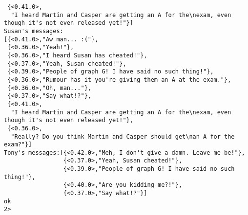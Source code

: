 \begin{verbatim}
 {<0.41.0>,
  "I heard Martin and Casper are getting an A for the\nexam, even though it's not even released yet!"}]
Susan's messages:
[{<0.41.0>,"Aw man... :("},
 {<0.36.0>,"Yeah!"},
 {<0.36.0>,"I heard Susan has cheated!"},
 {<0.37.0>,"Yeah, Susan cheated!"},
 {<0.39.0>,"People of graph G! I have said no such thing!"},
 {<0.36.0>,"Rumour has it you're giving them an A at the exam."},
 {<0.36.0>,"Oh, man..."},
 {<0.37.0>,"Say what!?"},
 {<0.41.0>,
  "I heard Martin and Casper are getting an A for the\nexam, even though it's not even released yet!"},
 {<0.36.0>,
  "Really? Do you think Martin and Casper should get\nan A for the exam?"}]
Tony's messages:[{<0.42.0>,"Meh, I don't give a damn. Leave me be!"},
                 {<0.37.0>,"Yeah, Susan cheated!"},
                 {<0.39.0>,"People of graph G! I have said no such thing!"},
                 {<0.40.0>,"Are you kidding me?!"},
                 {<0.37.0>,"Say what!?"}]
ok
2>

\end{verbatim}